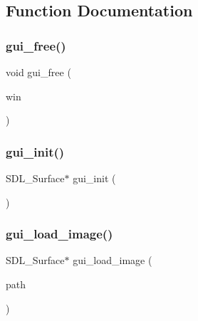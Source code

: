 \subsection{Function Documentation}
\mbox{\label{gui_8c_a3503dc62ac89480ae9d98796a64c6555}} 
\subsubsection{gui\+\_\+free()}
{\footnotesize\ttfamily void gui\+\_\+free (\begin{DoxyParamCaption}\item[{S\+D\+L\+\_\+\+Surface $\ast$}]{win }\end{DoxyParamCaption})\hspace{0.3cm}{\ttfamily [inline]}}

\mbox{\label{gui_8c_ae520d31222038882a553a4b9f32991fa}} 
\subsubsection{gui\+\_\+init()}
{\footnotesize\ttfamily S\+D\+L\+\_\+\+Surface$\ast$ gui\+\_\+init (\begin{DoxyParamCaption}{ }\end{DoxyParamCaption})\hspace{0.3cm}{\ttfamily [inline]}}

\mbox{\label{gui_8c_a91b7d91fbed120d172407682412abc27}} 
\subsubsection{gui\+\_\+load\+\_\+image()}
{\footnotesize\ttfamily S\+D\+L\+\_\+\+Surface$\ast$ gui\+\_\+load\+\_\+image (\begin{DoxyParamCaption}\item[{char $\ast$}]{path }\end{DoxyParamCaption})\hspace{0.3cm}{\ttfamily [inline]}}

